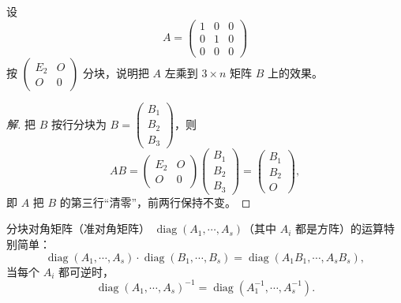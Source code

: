 \begin{example}
设
\[
  A=\begin{pmatrix} 1 & 0 & 0 \\ 0 & 1 & 0 \\ 0 & 0 & 0 \end{pmatrix}
\]
按 $\begin{pmatrix} E_2 & O \\ O & 0 \end{pmatrix}$ 分块，说明把 $A$ 左乘到
$3\times n$ 矩阵 $B$ 上的效果。
\end{example}
\begin{proof}[解]
把 $B$ 按行分块为 $B=\begin{pmatrix} B_1 \\ B_2 \\ B_3 \end{pmatrix}$，则
\[
  AB=\begin{pmatrix} E_2 & O \\ O & 0 \end{pmatrix}
      \begin{pmatrix} B_1 \\ B_2 \\ B_3 \end{pmatrix}
    =\begin{pmatrix} B_1 \\ B_2 \\ O \end{pmatrix},
\]
即 $A$ 把 $B$ 的第三行“清零”，前两行保持不变。
\end{proof}

分块对角矩阵（准对角矩阵）
$\operatorname{diag}(A_1,\cdots,A_s)$（其中 $A_i$ 都是方阵）的运算特别简单：
\[
  \operatorname{diag}(A_1,\cdots,A_s)\cdot\operatorname{diag}(B_1,\cdots,B_s)
  =\operatorname{diag}(A_1B_1,\cdots,A_sB_s),
\]
当每个 $A_i$ 都可逆时，
\[
  \operatorname{diag}(A_1,\cdots,A_s)^{-1}
  =\operatorname{diag}(A_1^{-1},\cdots,A_s^{-1}).
\]

